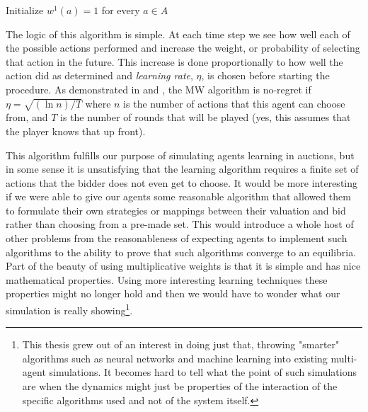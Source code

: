 \documentclass[12pt,twoside]{reedthesis}
\begin{document}
\begin{algorithm}[H]
	Initialize $w^1(a) = 1$ for every $a\in A$\\
\end{algorithm}
\vspace{1cm}
The logic of this algorithm is simple. At each time step we see how well each of the possible actions performed and increase the weight, or probability of selecting that action in the future. This increase is done proportionally to how well the action did as determined and \textit{learning rate}, $\eta$, is chosen before starting the procedure. As demonstrated in \cite{Roughgarden2016} and \cite{Blum2007}, the MW algorithm is no-regret if $\eta = \sqrt{(\ln n) / T}$ where $n$ is the number of actions that this agent can choose from, and $T$ is the number of rounds that will be played (yes, this assumes that the player knows that up front).

This algorithm fulfills our purpose of simulating agents learning in auctions, but in some sense it is unsatisfying that the learning algorithm requires a finite set of actions that the bidder does not even get to choose. It would be more interesting if we were able to give our agents some reasonable algorithm that allowed them to formulate their own strategies or mappings between their valuation and bid rather than choosing from a pre-made set. This would introduce a whole host of other problems from the reasonableness of expecting agents to implement such algorithms to the ability to prove that such algorithms converge to an equilibria. Part of the beauty of using multiplicative weights is that it is simple and has nice mathematical properties. Using more interesting learning techniques these properties might no longer hold and then we would have to wonder what our simulation is really showing\footnote{This thesis grew out of an interest in doing just that, throwing "smarter" algorithms such as neural networks and machine learning into existing multi-agent simulations. It becomes hard to tell what the point of such simulations are when the dynamics might just be properties of the interaction of the specific algorithms used and not of the system itself.}.
\end{document}
